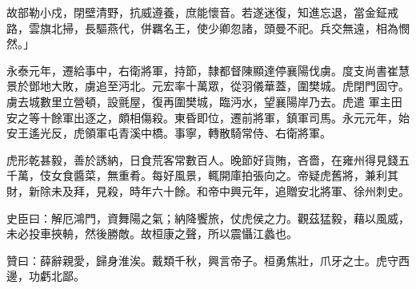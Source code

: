 \begin{pinyinscope}
 故部勒小戍，閉壁清野，抗威遵養，庶能懷音。若遂迷復，知進忘退，當金鉦戒路，雲旗北掃，長驅燕代，併羈名王，使少卿忽諸，頭曼不祀。兵交無遠，相為憫然。」



 永泰元年，遷給事中，右衛將軍，持節，隸都督陳顯達停襄陽伐虜。度支尚書崔慧景於鄧地大敗，虜追至沔北。元宏率十萬眾，從羽儀華蓋，圍樊城。虎閉門固守。虜去城數里立營頓，設氈屋，復再圍樊城，臨沔水，望襄陽岸乃去。虎遣
 軍主田安之等十餘軍出逐之，頗相傷殺。東昏即位，遷前將軍，鎮軍司馬。永元元年，始安王遙光反，虎領軍屯青溪中橋。事寧，轉散騎常侍、右衛將軍。



 虎形乾甚毅，善於誘納，日食荒客常數百人。晚節好貨賄，吝嗇，在雍州得見錢五千萬，伎女食醬菜，無重肴。每好風景，輒開庫拍張向之。帝疑虎舊將，兼利其財，新除未及拜，見殺，時年六十餘。和帝中興元年，追贈安北將軍、徐州刺史。



 史臣曰：解厄鴻門，資舞陽之氣；納降饗旅，仗虎侯之力。觀茲猛毅，藉以風威，未必投車挾輈，然後勝敵。故桓康之聲，所以震懾江蠡也。



 贊曰：薛辭親愛，歸身淮涘。戴類千秋，興言帝子。桓勇焦壯，爪牙之士。虎守西邊，功虧北鄙。



\end{pinyinscope}